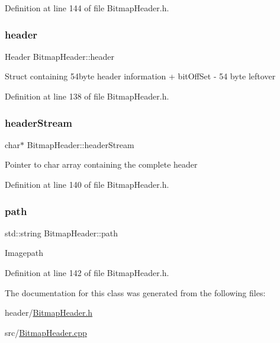 Definition at line 144 of file Bitmap\+Header.\+h.

\mbox{\label{classBitmapHeader_ab1e2a2c32e87d647977bbd3e700f2265}} 
\subsubsection{\texorpdfstring{header}{header}}
{\footnotesize\ttfamily Header Bitmap\+Header\+::header\hspace{0.3cm}{\ttfamily [private]}}

Struct containing 54byte header information + bit\+Off\+Set -\/ 54 byte leftover 

Definition at line 138 of file Bitmap\+Header.\+h.

\mbox{\label{classBitmapHeader_a9109a897251733f77942008318482426}} 
\subsubsection{\texorpdfstring{headerStream}{headerStream}}
{\footnotesize\ttfamily char$\ast$ Bitmap\+Header\+::header\+Stream\hspace{0.3cm}{\ttfamily [private]}}

Pointer to char array containing the complete header 

Definition at line 140 of file Bitmap\+Header.\+h.

\mbox{\label{classBitmapHeader_a928111fbaf59eebf24b750cbca11c5dd}} 
\subsubsection{\texorpdfstring{path}{path}}
{\footnotesize\ttfamily std\+::string Bitmap\+Header\+::path\hspace{0.3cm}{\ttfamily [private]}}

Imagepath 

Definition at line 142 of file Bitmap\+Header.\+h.



The documentation for this class was generated from the following files\+:\begin{DoxyCompactItemize}
\item 
header/\mbox{\hyperlink{BitmapHeader_8h}{Bitmap\+Header.\+h}}\item 
src/\mbox{\hyperlink{BitmapHeader_8cpp}{Bitmap\+Header.\+cpp}}\end{DoxyCompactItemize}
